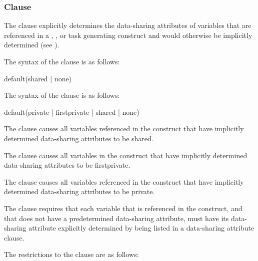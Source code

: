 \subsubsection{ Clause}
\label{subsubsec:default clause}
\summary
The  clause explicitly determines the data-sharing attributes of variables that
are referenced in a , , or task generating construct
and would otherwise be implicitly determined (see
).

\syntax
\begin{ccppspecific}
The syntax of the  clause is as follows:

\begin{ompSyntax}
default(shared \textnormal{|} none)
\end{ompSyntax}
\end{ccppspecific}
%
\begin{fortranspecific}
The syntax of the  clause is as follows:

\begin{ompSyntax}
default(private \textnormal{|} firstprivate \textnormal{|} shared \textnormal{|} none)
\end{ompSyntax}
\end{fortranspecific}
%
\descr
The  clause causes all variables referenced in the construct that
have implicitly determined data-sharing attributes to be shared.

\begin{fortranspecific}
The  clause causes all variables in the construct that have
implicitly determined data-sharing attributes to be firstprivate.

The  clause causes all variables referenced in the construct that
have implicitly determined data-sharing attributes to be private.
\end{fortranspecific}

The  clause requires that each variable that is referenced in the
construct, and that does not have a predetermined data-sharing attribute, must have its
data-sharing attribute explicitly determined by being listed in a data-sharing attribute
clause.

\restrictions
The restrictions to the  clause are as follows:

